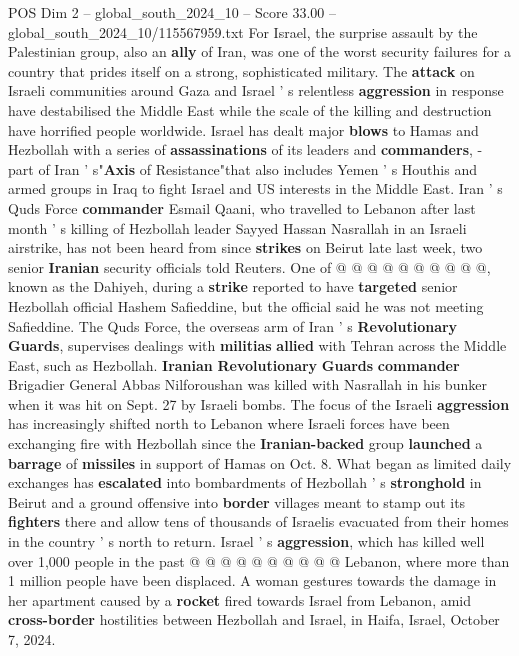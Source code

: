 \begin{textsample}{POS Dim 2 – global\_south\_2024\_10 – Score 33.00 – global\_south\_2024\_10/115567959.txt}
For Israel, the surprise assault by the Palestinian group, also an \textbf{ally} of Iran, was one of the worst security failures for a country that prides itself on a strong, sophisticated military.
The \textbf{attack} on Israeli communities around Gaza and Israel ' s relentless \textbf{aggression} in response have destabilised the Middle East while the scale of the killing and destruction have horrified people worldwide.
Israel has dealt major \textbf{blows} to Hamas and Hezbollah with a series of \textbf{assassinations} of its leaders and \textbf{commanders}, - part of Iran ' s"\textbf{Axis} of Resistance"that also includes Yemen ' s Houthis and armed groups in Iraq to fight Israel and US interests in the Middle East.
Iran ' s Quds Force \textbf{commander} Esmail Qaani, who travelled to Lebanon after last month ' s killing of Hezbollah leader Sayyed Hassan Nasrallah in an Israeli airstrike, has not been heard from since \textbf{strikes} on Beirut late last week, two senior \textbf{Iranian} security officials told Reuters.
One of @ @ @ @ @ @ @ @ @ @, known as the Dahiyeh, during a \textbf{strike} reported to have \textbf{targeted} senior Hezbollah official Hashem Safieddine, but the official said he was not meeting Safieddine.
The Quds Force, the overseas arm of Iran ' s \textbf{Revolutionary} \textbf{Guards}, supervises dealings with \textbf{militias} \textbf{allied} with Tehran across the Middle East, such as Hezbollah. \textbf{Iranian} \textbf{Revolutionary} \textbf{Guards} \textbf{commander} Brigadier General Abbas Nilforoushan was killed with Nasrallah in his bunker when it was hit on Sept. 27 by Israeli bombs.
The focus of the Israeli \textbf{aggression} has increasingly shifted north to Lebanon where Israeli forces have been exchanging fire with Hezbollah since the \textbf{Iranian-backed} group \textbf{launched} a \textbf{barrage} of \textbf{missiles} in support of Hamas on Oct. 8.
What began as limited daily exchanges has \textbf{escalated} into bombardments of Hezbollah ' s \textbf{stronghold} in Beirut and a ground offensive into \textbf{border} villages meant to stamp out its \textbf{fighters} there and allow tens of thousands of Israelis evacuated from their homes in the country ' s north to return.
Israel ' s \textbf{aggression}, which has killed well over 1,000 people in the past @ @ @ @ @ @ @ @ @ @ Lebanon, where more than 1 million people have been displaced.
A woman gestures towards the damage in her apartment caused by a \textbf{rocket} fired towards Israel from Lebanon, amid \textbf{cross-border} hostilities between Hezbollah and Israel, in Haifa, Israel, October 7, 2024.

\end{textsample}
